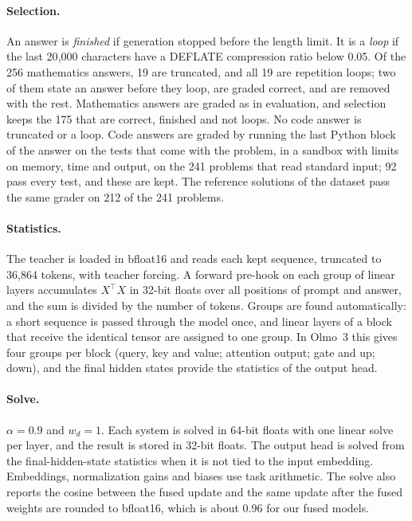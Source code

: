 \paragraph{Selection.} An answer is \emph{finished} if generation stopped
before the length limit. It is a \emph{loop} if the last 20{,}000 characters
have a DEFLATE compression ratio below 0.05. Of the 256 mathematics answers,
19 are truncated, and all 19 are repetition loops; two of them state an answer
before they loop, are graded correct, and are removed with the rest.
Mathematics answers are graded as in evaluation, and selection keeps the 175
that are correct, finished and not loops. No code answer is truncated or a
loop. Code answers are graded by running the last Python block of the answer
on the tests that come with the problem, in a sandbox with limits on memory,
time and output, on the 241 problems that read standard input; 92 pass every
test, and these are kept. The reference solutions of the dataset pass the same
grader on 212 of the 241 problems.

\paragraph{Statistics.} The teacher is loaded in bfloat16 and reads each kept
sequence, truncated to 36{,}864 tokens, with teacher forcing. A forward
pre-hook on each group of linear layers accumulates $X^{\!\top}X$ in 32-bit
floats over all positions of prompt and answer, and the sum is divided by the
number of tokens. Groups are found automatically: a short sequence is passed
through the model once, and linear layers of a block that receive the
identical tensor are assigned to one group. In Olmo~3 this gives four groups
per block (query, key and value; attention output; gate and up; down), and
the final hidden states provide the statistics of the output head.

\paragraph{Solve.} $\alpha=0.9$ and $w_d=1$. Each system is solved in 64-bit
floats with one linear solve per layer, and the result is stored in 32-bit
floats. The output head is solved from the final-hidden-state statistics when
it is not tied to the input embedding. Embeddings, normalization gains and
biases use task arithmetic. The solve also reports the cosine between the
fused update and the same update after the fused weights are rounded to
bfloat16, which is about 0.96 for our fused models.

